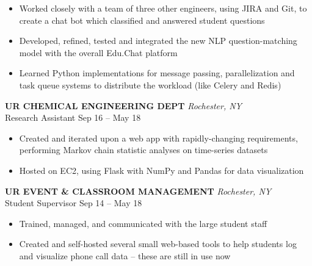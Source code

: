 \documentclass[letterpaper]{article}
\begin{document}
\begin{bgbox}[height=\paperheight, colback=white, width=0.62\textwidth]
\begin{itemize} [noitemsep,topsep=4pt]
			\item Worked closely with a team of three other engineers, using JIRA and Git, to create a chat bot which classified and answered student questions
			\item Developed, refined, tested and integrated the new NLP question-matching model with the overall Edu.Chat platform
			\item Learned Python implementations for message passing, parallelization and task queue systems to distribute the workload (like Celery and Redis)
		\end{itemize}
		\vspace*{12pt}
		\textbf{UR CHEMICAL ENGINEERING DEPT} \hfill \textit{Rochester, NY}\\
		Research Assistant \hfill Sep 16 -- May 18
		\begin{itemize} [noitemsep,topsep=4pt]
			\item Created and iterated upon a web app with rapidly-changing requirements, performing Markov chain statistic analyses on time-series datasets
			\item Hosted on EC2, using Flask with NumPy and Pandas for data visualization
		\end{itemize}
		\vspace*{12pt}
		\textbf{UR EVENT \& CLASSROOM MANAGEMENT} \hfill \textit{Rochester, NY}\\
		Student Supervisor \hfill Sep 14 -- May 18
		\begin{itemize} [noitemsep,topsep=4pt]
			\item Trained, managed, and communicated with the large student staff
			\item Created and self-hosted several small web-based tools to help students log and visualize phone call data -- these are still in use now
		\end{itemize}

	\end{bgbox}%
\end{document}
